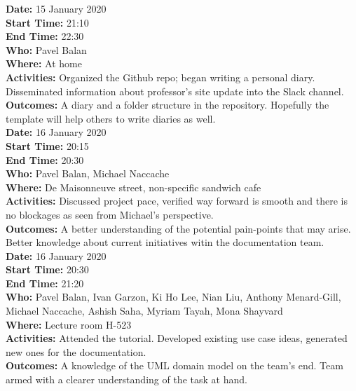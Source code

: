 \documentclass[12pt]{article}
\begin{document}
{\bf Date:} 15 January 2020\\
{\bf Start Time:} 21:10\\
{\bf End Time:} 22:30 \\
{\bf Who:} Pavel Balan\\
{\bf Where:} At home \\
{\bf Activities:} Organized the Github repo; began writing a personal diary. Disseminated information about professor's site update into the Slack channel.\\
{\bf Outcomes:} A diary and a folder structure in the repository. Hopefully the template will help others to write diaries as well.\\

{\bf Date:} 16 January 2020\\
{\bf Start Time:} 20:15\\
{\bf End Time:} 20:30 \\
{\bf Who:} Pavel Balan, Michael Naccache\\
{\bf Where:} De Maisonneuve street, non-specific sandwich cafe\\
{\bf Activities:} Discussed project pace, verified way forward is smooth and there is no blockages as seen from Michael's perspective.\\
{\bf Outcomes:} A better understanding of the potential pain-points that may arise. Better knowledge about current initiatives witin the documentation team.\\

{\bf Date:} 16 January 2020\\
{\bf Start Time:} 20:30\\
{\bf End Time:} 21:20 \\
{\bf Who:} Pavel Balan, Ivan Garzon, Ki Ho Lee, Nian Liu, Anthony Menard-Gill, Michael Naccache, Ashish Saha, Myriam Tayah, Mona Shayvard\\
{\bf Where:} Lecture room H-523 \\
{\bf Activities:} Attended the tutorial. Developed existing use case ideas, generated new ones for the documentation.\\
{\bf Outcomes:} A knowledge of the UML domain model on the team's end. Team armed with a clearer understanding of the task at hand.\\
\end{document}
